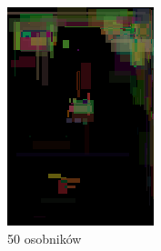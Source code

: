 \begin{figure}[!htb]
\begin{subfigure}[b]{0.3\textwidth}
         \includegraphics[width=\textwidth]{images/mona/num_of_best/50.png}
         \caption{50 osobników}
    \end{subfigure}
    \begin{subfigure}[b]{0.3\textwidth}
        \centering
        \label{fig:num_of_best_100}

\end{subfigure}
\end{figure}
